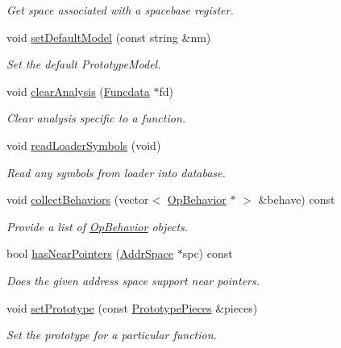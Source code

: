 \begin{DoxyCompactItemize}
\begin{DoxyCompactList}\small\item\em Get space associated with a {\itshape spacebase} register. \end{DoxyCompactList}\item 
void \mbox{\hyperlink{class_architecture_afc351278b2e416181b2a7c5b65cc614b}{set\+Default\+Model}} (const string \&nm)
\begin{DoxyCompactList}\small\item\em Set the default Prototype\+Model. \end{DoxyCompactList}\item 
void \mbox{\hyperlink{class_architecture_a5cb912926505aad414d6054071a9e8d8}{clear\+Analysis}} (\mbox{\hyperlink{class_funcdata}{Funcdata}} $\ast$fd)
\begin{DoxyCompactList}\small\item\em Clear analysis specific to a function. \end{DoxyCompactList}\item 
void \mbox{\hyperlink{class_architecture_ac6c95a933f8a42d6d1d46d8663a793a2}{read\+Loader\+Symbols}} (void)
\begin{DoxyCompactList}\small\item\em Read any symbols from loader into database. \end{DoxyCompactList}\item 
void \mbox{\hyperlink{class_architecture_a5499f02b08260cd95354143546fd374b}{collect\+Behaviors}} (vector$<$ \mbox{\hyperlink{class_op_behavior}{Op\+Behavior}} $\ast$ $>$ \&behave) const
\begin{DoxyCompactList}\small\item\em Provide a list of \mbox{\hyperlink{class_op_behavior}{Op\+Behavior}} objects. \end{DoxyCompactList}\item 
bool \mbox{\hyperlink{class_architecture_a70c9e30f83ab8aba74049198f802baa7}{has\+Near\+Pointers}} (\mbox{\hyperlink{class_addr_space}{Addr\+Space}} $\ast$spc) const
\begin{DoxyCompactList}\small\item\em Does the given address space support {\itshape near} pointers. \end{DoxyCompactList}\item 
void \mbox{\hyperlink{class_architecture_a10d78ec7be0df339288b7b3adc4c38e7}{set\+Prototype}} (const \mbox{\hyperlink{struct_prototype_pieces}{Prototype\+Pieces}} \&pieces)
\begin{DoxyCompactList}\small\item\em Set the prototype for a particular function. \end{DoxyCompactList}\item 

\end{DoxyCompactItemize}
